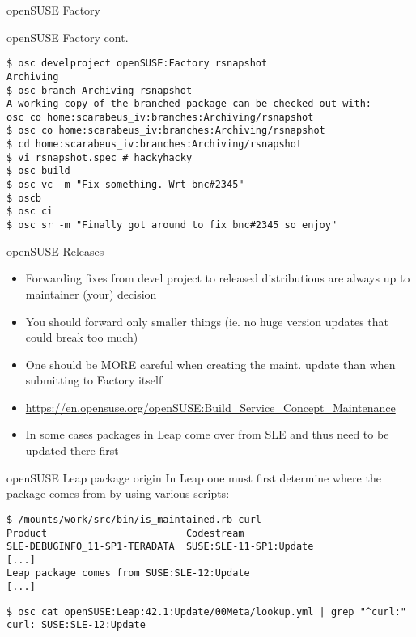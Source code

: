 \documentclass{beamer}
\begin{document}
\begin{frame}{openSUSE Factory}
\end{frame}

\begin{frame}[fragile]{openSUSE Factory cont.}
	\begin{tiny}
	\begin{verbatim}
$ osc develproject openSUSE:Factory rsnapshot
Archiving
$ osc branch Archiving rsnapshot
A working copy of the branched package can be checked out with:
osc co home:scarabeus_iv:branches:Archiving/rsnapshot
$ osc co home:scarabeus_iv:branches:Archiving/rsnapshot
$ cd home:scarabeus_iv:branches:Archiving/rsnapshot
$ vi rsnapshot.spec # hackyhacky
$ osc build
$ osc vc -m "Fix something. Wrt bnc#2345"
$ oscb
$ osc ci
$ osc sr -m "Finally got around to fix bnc#2345 so enjoy"
	\end{verbatim}
	\end{tiny}
\end{frame}

\begin{frame}[t]{openSUSE Releases}
	\begin{itemize}
	\item Forwarding fixes from devel project to released distributions are always up to maintainer (your) decision
	\item You should forward only smaller things (ie. no huge version updates that could break too much)
	\item One should be MORE careful when creating the maint. update than when submitting to Factory itself
	\item \url{https://en.opensuse.org/openSUSE:Build\_Service\_Concept\_Maintenance}
	\item In some cases packages in Leap come over from SLE and thus need to be updated there first
	\end{itemize}
\end{frame}

\begin{frame}[fragile]{openSUSE Leap package origin}
In Leap one must first determine where the package comes from by using various
scripts:
\begin{small}
\begin{verbatim}$ /mounts/work/src/bin/is_maintained.rb curl
Product                        Codestream
SLE-DEBUGINFO_11-SP1-TERADATA  SUSE:SLE-11-SP1:Update
[...]
Leap package comes from SUSE:SLE-12:Update
[...]\end{verbatim}
\end{small}
\begin{small}
\begin{verbatim}$ osc cat openSUSE:Leap:42.1:Update/00Meta/lookup.yml | grep "^curl:"
curl: SUSE:SLE-12:Update\end{verbatim}
\end{small}
\end{frame}
\end{document}
